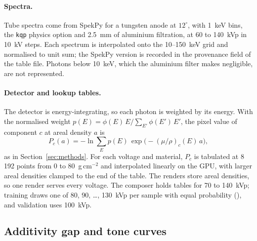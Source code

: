 \paragraph{Spectra.} Tube spectra come from SpekPy \citep{poludniowski2021spekpy} for a tungsten anode at $12^\circ$, with 1~keV bins, the
\texttt{kqp} physics option and 2.5~mm of aluminium filtration, at 60 to 140~kVp in 10~kV steps. Each spectrum is interpolated onto the
10--150~keV grid and normalised to unit sum; the SpekPy version is recorded in the provenance field of the table file. Photons below 10~keV,
which the aluminium filter makes negligible, are not represented.

\paragraph{Detector and lookup tables.} The detector is energy-integrating, so each photon is weighted by its energy. With the normalised weight
$p(E)=\phi(E)\,E/\sum_{E'}\phi(E')\,E'$, the pixel value of component $c$ at areal density $a$ is
\begin{equation}
  P_c(a) = -\ln\sum_E p(E)\,\exp\!\big(-(\mu/\rho)_c(E)\,a\big),
  \label{eq:dp-pixel}
\end{equation}
as in Section~\ref{sec:methods}. For each voltage and material, $P_c$ is tabulated at 8\,192 points from 0 to 80~g\,cm$^{-2}$ and interpolated
linearly on the GPU, with larger areal densities clamped to the end of the table. The renders store areal densities, so one render serves every
voltage. The composer holds tables for 70 to 140~kVp; training draws one of 80, 90, \ldots, 130~kVp per sample with equal probability
(), and validation uses 100~kVp.

\subsection{Additivity gap and tone curves}
\label{ssec:dp-gap}
